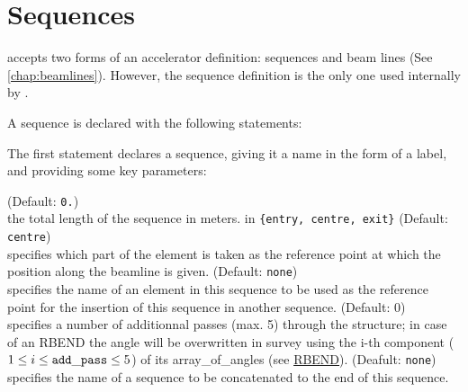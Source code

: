
\chapter{Sequences}
\label{chap:sequence}

\madx accepts two forms of an accelerator definition: sequences and
beam lines (See \ref{chap:beamlines}). However, the sequence definition is the only
one used internally by \madx.

A sequence is declared with the following statements:

The first statement declares a sequence, giving it a name in the form of
a label, and providing some key parameters: 

\begin{madlist}
    (Default: {\tt 0.})\\
     the total length of the sequence in meters. 
    in {\tt \{entry, centre, exit\}} (Default:
          {\tt centre}) \\
     specifies which part of the element is taken as the reference point 
     at which the position along the beamline is given.
    (Default: {\tt none})\\
   specifies the name of an element in this sequence to be used as the
   reference point for the insertion of this sequence in another
   sequence.  
    (Default: 0)\\ 
     specifies a number of additionnal passes (max. 5) through the
     structure; in case of an RBEND the angle will be overwritten in  survey
     using the i-th component ($1 \le i \le {\tt add\_pass} \le 5$) of
     its array\_of\_angles (see \href{bend.html}{RBEND}). 
    (Deafult: {\tt none})\\
     specifies the name of a sequence to be concatenated 
     to the end of this sequence. 
\end{madlist}
 
